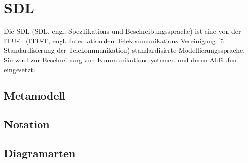 \section{\acf{SDL}}
\label{sc:SDL}
Die \ac{SDL} (SDL, engl. Spezifikations und Beschreibungssprache) ist eine von der \ac{ITU-T} (ITU-T, engl. Internationalen Telekommunikations Vereinigung für Standardisierung der Telekommunikation) standardisierte Modellierungssprache. Sie wird zur Beschreibung von Kommunikationssystemen und deren Abläufen eingesetzt.
\subsection{Metamodell}
\subsection{Notation}
\subsection{Diagramarten}
